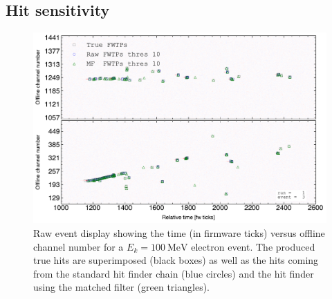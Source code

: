 \subsection{Hit sensitivity}
\label{subsec:2.5.3}

\begin{figure}
	\centering
	\includegraphics[width=0.9\linewidth]{Images/Matched_Filter/electron_k100_full_run_1_evt_3}
	\caption[Raw event display for an electron event showing the true, standard, and matched filter hits produced.]{Raw event display showing the time (in firmware ticks) versus offline channel number for a $E_{k} = 100 \ \mathrm{MeV}$ electron event. The produced true hits are superimposed (black boxes) as well as the hits coming from the standard hit finder chain (blue circles) and the hit finder using the matched filter (green triangles).}
	\label{fig:evthitcomp}
\end{figure}

